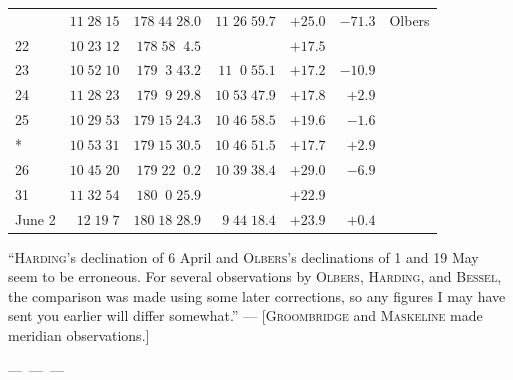 \begin{longtable}{lrrrrrl}
 & $11\;28\;15$ & $178\;44\;28.0$ & $11\;26\;59.7$ & $+25.0$ & $-71.3$ & Olbers \\
22 & $10\;23\;12$ & $178\;58\;\;4.5$ &  & $+17.5$ &  &  \\
23 & $10\;52\;10$ & $179\;\;3\;43.2$ & $11\;\;0\;55.1$ & $+17.2$ & $-10.9$ &  \\
24 & $11\;28\;23$ & $179\;\;9\;29.8$ & $10\;53\;47.9$ & $+17.8$ & $+2.9$ &  \\
25 & $10\;29\;53$ & $179\;15\;24.3$ & $10\;46\;58.5$ & $+19.6$ & $-1.6$ &  \\*
 & $10\;53\;31$ & $179\;15\;30.5$ & $10\;46\;51.5$ & $+17.7$ & $+2.9$ &  \\
26 & $10\;45\;20$ & $179\;22\;\;0.2$ & $10\;39\;38.4$ & $+29.0$ & $-6.9$ &  \\
31 & $11\;32\;54$ & $180\;\;0\;25.9$ &  & $+22.9$ &  &  \\
June 2 & $12\;19\;7$ & $180\;18\;28.9$ & $9\;44\;18.4$ & $+23.9$ & $+0.4$ &  \\
\end{longtable}
\endgroup
\smallskip
\par\indent “\textsc{Harding}’s declination of 6 April and \textsc{Olbers}’s declinations of 1 and 19 May seem to be erroneous. For several observations by \textsc{Olbers}, \textsc{Harding}, and \textsc{Bessel}, the comparison was made using some later corrections, so any figures I may have sent you earlier will differ somewhat.” — [\textsc{Groombridge} and \textsc{Maskeline} made meridian observations.]

\smallskip
\noindent---\ ---\ ---

\begin{flushright}
\end{flushright}
